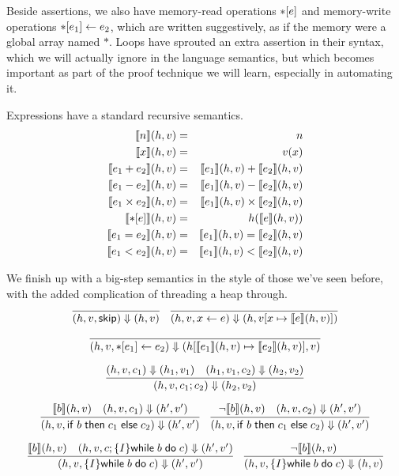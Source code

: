\documentclass{amsbook}
\theoremstyle{definition}
\theoremstyle{remark}
\numberwithin{section}{chapter}
\numberwithin{equation}{chapter}
\begin{document}
Beside assertions, we also have memory-read operations ${*}[e]$ and memory-write operations ${*}[e_1] \leftarrow e_2$, which are written suggestively, as if the memory were a global array named $*$.
Loops have sprouted an extra assertion in their syntax, which we will actually ignore in the language semantics, but which becomes important as part of the proof technique we will learn, especially in automating it.

Expressions have a standard recursive semantics.
\begin{eqnarray*}
  {\left \llbracket n \right \rrbracket}(h, v) &=& n \\
  {\left \llbracket x \right \rrbracket}(h, v) &=& v(x) \\
  {\left \llbracket e_1 + e_2 \right \rrbracket}(h, v) &=& {\left \llbracket e_1 \right \rrbracket}(h, v) + {\left \llbracket e_2 \right \rrbracket}(h, v) \\
  {\left \llbracket e_1 - e_2 \right \rrbracket}(h, v) &=& {\left \llbracket e_1 \right \rrbracket}(h, v) - {\left \llbracket e_2 \right \rrbracket}(h, v) \\
  {\left \llbracket e_1 \times e_2 \right \rrbracket}(h, v) &=& {\left \llbracket e_1 \right \rrbracket}(h, v) \times {\left \llbracket e_2 \right \rrbracket}(h, v) \\
  {\left \llbracket {*}[e] \right \rrbracket}(h, v) &=& h({\left \llbracket e \right \rrbracket}(h, v)) \\
  {\left \llbracket e_1 = e_2 \right \rrbracket}(h, v) &=& {\left \llbracket e_1 \right \rrbracket}(h, v) = {\left \llbracket e_2 \right \rrbracket}(h, v) \\
  {\left \llbracket e_1 < e_2 \right \rrbracket}(h, v) &=& {\left \llbracket e_1 \right \rrbracket}(h, v) < {\left \llbracket e_2 \right \rrbracket}(h, v)
\end{eqnarray*}

We finish up with a big-step semantics in the style of those we've seen before, with the added complication of threading a heap through.
\encoding
$$\infer{\bigstep{(h, v, \skipe)}{(h, v)}}{}
\quad \infer{\bigstep{(h, v, \assign{x}{e})}{(h, \mupd{v}{x}{\denote{e}(h, v)})}}{}$$

$$\infer{\bigstep{(h, v, \writeto{e_1}{e_2})}{(\mupd{h}{\denote{e_1}(h, v)}{\denote{e_2}(h, v)}, v)}}{}$$

$$\infer{\bigstep{(h, v, c_1; c_2)}{(h_2, v_2)}}{
  \bigstep{(h, v, c_1)}{(h_1, v_1)}
  & \bigstep{(h_1, v_1, c_2)}{(h_2, v_2)}
}$$

$$\infer{\bigstep{(h, v, \ifte{b}{c_1}{c_2})}{(h', v')}}{
  \denote{b}(h, v)
  & \bigstep{(h, v, c_1)}{(h', v')}
}
\quad \infer{\bigstep{(h, v, \ifte{b}{c_1}{c_2})}{(h', v')}}{
  \neg \denote{b}(h, v)
  & \bigstep{(h, v, c_2)}{(h', v')}
}$$

$$\infer{\bigstep{(h, v, \{I\} \while{b}{c})}{(h', v')}}{
  \denote{b}(h, v)
  & \bigstep{(h, v, c; \{I\} \while{b}{c})}{(h', v')}
}
\quad \infer{\bigstep{(h, v, \{I\} \while{b}{c})}{(h, v)}}{
  \neg \denote{b}(h, v)
}$$
\end{document}

